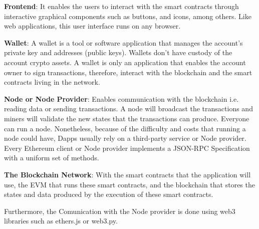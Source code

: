 \documentclass[11pt,a4paper]{report}
\begin{document}
\begin{description}		
	\item \textbf{Frontend}: It enables the users to interact with the smart contracts through interactive graphical components such as buttons, and icons, among others. Like web applications, this user interface runs on any browser.
	\item \textbf{Wallet}: A wallet is a tool or software application that manages the account's private key and addresses (public keys). Wallets don't have custody of the account crypto assets. A wallet is only an application that enables the account owner to sign transactions, therefore, interact with the blockchain and the smart contracts living in the network.
	\item \textbf{Node or Node Provider}: Enables communication with the blockchain i.e. reading data or sending transactions. A node will broadcast the transactions and miners will validate the new states that the transactions can produce. Everyone can run a node. Nonetheless, because of the difficulty and costs that running a node could have, Dapps usually rely on a third-party service or Node provider. Every Ethereum client or Node provider implements a JSON-RPC\cite{json_rpc} Specification with a uniform set of methods.
	\item \textbf{The Blockchain Network}: With the smart contracts that the application will use, the EVM that runs these smart contracts, and the blockchain that stores the states and data produced by the execution of these smart contracts.
\end{description}
Furthermore, the Comunication with the Node provider is done using web3 libraries such as ethers.js\cite{ethersjs} or web3.py\cite{web3py}.
\end{document}
